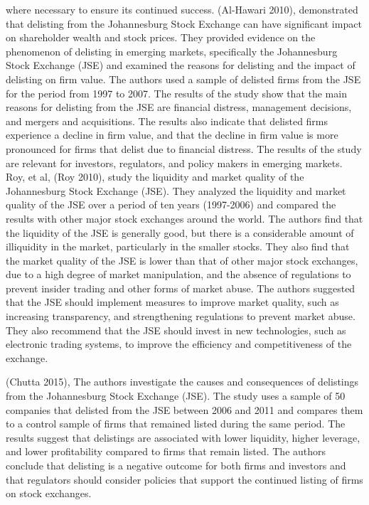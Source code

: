 \documentclass[
]{article}
\begin{document}
where necessary to ensure its continued success. (Al-Hawari 2010),
demonstrated that delisting from the Johannesburg Stock Exchange can
have significant impact on shareholder wealth and stock prices. They
provided evidence on the phenomenon of delisting in emerging markets,
specifically the Johannesburg Stock Exchange (JSE) and examined the
reasons for delisting and the impact of delisting on firm value. The
authors used a sample of delisted firms from the JSE for the period from
1997 to 2007. The results of the study show that the main reasons for
delisting from the JSE are financial distress, management decisions, and
mergers and acquisitions. The results also indicate that delisted firms
experience a decline in firm value, and that the decline in firm value
is more pronounced for firms that delist due to financial distress. The
results of the study are relevant for investors, regulators, and policy
makers in emerging markets. Roy, et al, (Roy 2010), study the liquidity
and market quality of the Johannesburg Stock Exchange (JSE). They
analyzed the liquidity and market quality of the JSE over a period of
ten years (1997-2006) and compared the results with other major stock
exchanges around the world. The authors find that the liquidity of the
JSE is generally good, but there is a considerable amount of illiquidity
in the market, particularly in the smaller stocks. They also find that
the market quality of the JSE is lower than that of other major stock
exchanges, due to a high degree of market manipulation, and the absence
of regulations to prevent insider trading and other forms of market
abuse. The authors suggested that the JSE should implement measures to
improve market quality, such as increasing transparency, and
strengthening regulations to prevent market abuse. They also recommend
that the JSE should invest in new technologies, such as electronic
trading systems, to improve the efficiency and competitiveness of the
exchange.

(Chutta 2015), The authors investigate the causes and consequences of
delistings from the Johannesburg Stock Exchange (JSE). The study uses a
sample of 50 companies that delisted from the JSE between 2006 and 2011
and compares them to a control sample of firms that remained listed
during the same period. The results suggest that delistings are
associated with lower liquidity, higher leverage, and lower
profitability compared to firms that remain listed. The authors conclude
that delisting is a negative outcome for both firms and investors and
that regulators should consider policies that support the continued
listing of firms on stock exchanges.
\end{document}
